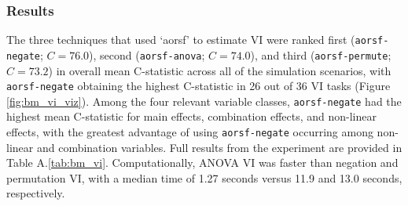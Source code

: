 \documentclass{article}\usepackage[]{graphicx}\usepackage[]{xcolor}
\newcommand{\tabrefAppendix}[1]{Table A.\ref{#1}}
\begin{document}
\subsubsection{Results} \label{sec:results_vi}



The three techniques that used `aorsf' to estimate VI were ranked first (\texttt{aorsf-negate}; $C = 76.0$), second (\texttt{aorsf-anova}; $C = 74.0$), and third (\texttt{aorsf-permute}; $C = 73.2$) in overall mean C-statistic across all of the simulation scenarios, with \texttt{aorsf-negate} obtaining the highest C-statistic in 26 out of 36 VI tasks (Figure \ref{fig:bm_vi_viz}). Among the four relevant variable classes, \texttt{aorsf-negate} had the highest mean C-statistic for main effects, combination effects, and non-linear effects, with the greatest advantage of using \texttt{aorsf-negate} occurring among non-linear and combination variables. Full results from the experiment are provided in \tabrefAppendix{tab:bm_vi}. Computationally, ANOVA VI was faster than negation and permutation VI, with a median time of 1.27 seconds versus 11.9 and 13.0 seconds, respectively.
\end{document}
